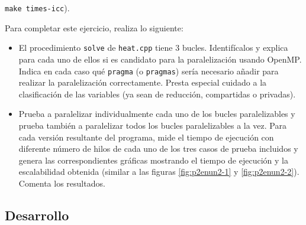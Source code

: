 \begin{ejer}
     \texttt{make times-icc}).
    \par Para completar este ejercicio, realiza lo siguiente:
    \begin{itemize}
        \item El procedimiento \texttt{solve} de \texttt{heat.cpp} tiene 3 bucles. Identifícalos y explica para cada uno
        de ellos si es candidato para la paralelización usando OpenMP. Indica en cada caso qué
        \texttt{pragma} (o \texttt{pragmas}) sería necesario añadir para realizar la paralelización correctamente.
        Presta especial cuidado a la clasificación de las variables (ya sean de reducción, compartidas
        o privadas).
        \item Prueba a paralelizar individualmente cada uno de los bucles paralelizables y prueba también a
        paralelizar todos los bucles paralelizables a la vez. Para cada versión resultante del programa,
        mide el tiempo de ejecución con diferente número de hilos de cada uno de los tres casos de
        prueba incluidos y genera las correspondientes gráficas mostrando el tiempo de ejecución y
        la escalabilidad obtenida (similar a las figuras \ref{fig:p2enun2-1} y \ref{fig:p2enun2-2}). Comenta los resultados.
    \end{itemize}
\end{ejer}
\begin{figure}[H]
    \centering
\end{figure}
\subsection{Desarrollo}
